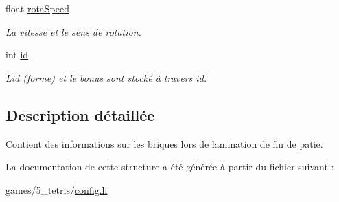 \begin{DoxyCompactItemize}
\mbox{\label{structDeadPiece_ae91947330a1e76454570da0192caa319}} 
float \hyperlink{structDeadPiece_ae91947330a1e76454570da0192caa319}{rota\+Speed}
\begin{DoxyCompactList}\small\item\em La vitesse et le sens de rotation. \end{DoxyCompactList}\item 
\mbox{\label{structDeadPiece_a7441ef0865bcb3db9b8064dd7375c1ea}} 
int \hyperlink{structDeadPiece_a7441ef0865bcb3db9b8064dd7375c1ea}{id}
\begin{DoxyCompactList}\small\item\em L\textquotesingle{}id (forme) et le bonus sont stocké à travers id. \end{DoxyCompactList}\end{DoxyCompactItemize}


\subsection{Description détaillée}
Contient des informations sur les briques lors de l\textquotesingle{}animation de fin de patie. 

La documentation de cette structure a été générée à partir du fichier suivant \+:\begin{DoxyCompactItemize}
\item 
games/5\+\_\+tetris/\hyperlink{config_8h}{config.\+h}\end{DoxyCompactItemize}
